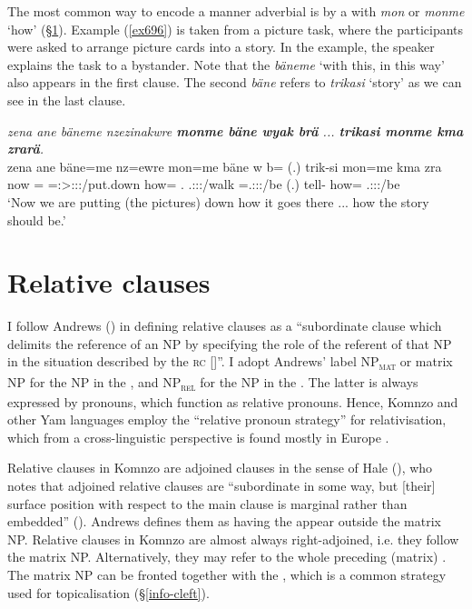 The most common way to encode a manner adverbial is by a  with \emph{mon} or \emph{monme} `how' ({\S}\ref{relclauses}). Example (\ref{ex696}) is taken from a picture task, where the participants were asked to arrange picture cards into a story. In the example, the speaker explains the task to a bystander. Note that the  \emph{bäneme} `with this, in this way' also appears in the first clause. The second  \emph{bäne} refers to \emph{trikasi} `story' as we can see in the last clause.

\largerpage
\begin{exe}
	\ex \emph{zena ane bäneme nzezinakwre \textbf{monme bäne wyak brä} ... \textbf{trikasi monme kma zrarä}.}\\
	\gll zena ane bäne=me nz=ewre mon=me bäne w b= (.) trik-si mon=me kma zra\\
	now {\Dem} \Recog={\Ins} \Immpst=\Fpl:\Sbj>\Stpl:\Obj:\Nonpast:\Ipfv/put.down how={\Ins} \Recog.{\Abs} \Tsg.\F:\Sbj:\Nonpast:\Ipfv/walk \Med=\Tsg.\F:\Sbj:\Nonpast:\Ipfv/be (.) tell-{\Nmlz} how={\Ins} {\Pot} \Tsg.\F:\Sbj:\Irr:\Ipfv/be\\
	\trans `Now we are putting (the pictures) down how it goes there ... how the story should be.'
	\label{ex696}
\end{exe}

\section{Relative clauses}\label{relclauses}

I follow Andrews (\citeyear[206]{Andrews:2007relclauses}) in defining relative clauses as a ``subordinate clause which delimits the reference of an NP by specifying the role of the referent of that NP in the situation described by the \textsc{rc} []''. I adopt Andrews' label NP\textsubscript{\textsc{mat}} or matrix NP for the NP in the , and NP\textsubscript{\textsc{rel}} for the NP in the . The latter is always expressed by  pronouns, which function as relative pronouns. Hence, Komnzo and other Yam languages employ the ``relative pronoun strategy'' for relativisation, which from a cross-linguistic perspective is found mostly in Europe \citep{Haspelmath:2001}.

Relative clauses in Komnzo are adjoined clauses in the sense of Hale (\citeyear{Hale:1976adjoined}), who notes that adjoined relative clauses are ``subordinate in some way, but [their] surface position with respect to the main clause is marginal rather than embedded'' (\citeyear[78]{Hale:1976adjoined}). Andrews defines them as having the  appear outside the matrix NP. Relative clauses in Komnzo are almost always right-adjoined, i.e. they follow the matrix NP. Alternatively, they may refer to the whole preceding (matrix) . The matrix NP can be fronted together with the , which is a common strategy used for topicalisation ({\S}\ref{info-cleft}).

